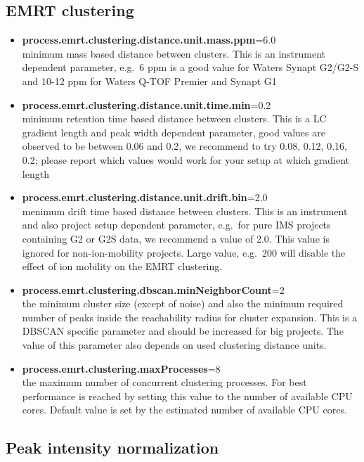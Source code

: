 \documentclass[]{article}
\providecommand{\tightlist}{%
  \setlength{\itemsep}{0pt}\setlength{\parskip}{0pt}}
\begin{document}
\subsection{EMRT clustering}\label{emrt-clustering}

\begin{itemize}
\tightlist
\item
  \textbf{process.emrt.clustering.distance.unit.mass.ppm}=6.0\\
  minimum mass based distance between clusters. This is an instrument
  dependent parameter, e.g.~6 ppm is a good value for Waters Synapt
  G2/G2-S and 10-12 ppm for Waters Q-TOF Premier and Synapt G1
\item
  \textbf{process.emrt.clustering.distance.unit.time.min}=0.2\\
  minimum retention time based distance between clusters. This is a LC
  gradient length and peak width dependent parameter, good values are
  observed to be between 0.06 and 0.2, we recommend to try 0.08, 0.12,
  0.16, 0.2; please report which values would work for your setup at
  which gradient length
\item
  \textbf{process.emrt.clustering.distance.unit.drift.bin}=2.0\\
  menimum drift time based distance between clusters. This is an
  instrument and also project setup dependent parameter, e.g.~for pure
  IMS projects containing G2 or G2S data, we recommend a value of 2.0.
  This value is ignored for non-ion-mobility projects. Large value,
  e.g.~200 will disable the effect of ion mobility on the EMRT
  clustering.
\item
  \textbf{process.emrt.clustering.dbscan.minNeighborCount}=2\\
  the minimum cluster size (except of noise) and also the minimum
  required number of peaks inside the reachability radius for cluster
  expansion. This is a DBSCAN specific parameter and should be increased
  for big projects. The value of this parameter also depends on used
  clustering distance units.
\item
  \textbf{process.emrt.clustering.maxProcesses}=8\\
  the maximum number of concurrent clustering processes. For best
  performance is reached by setting this value to the number of
  available CPU cores. Default value is set by the estimated number of
  available CPU cores.
\end{itemize}

\subsection{Peak intensity
normalization}\label{peak-intensity-normalization}
\end{document}
